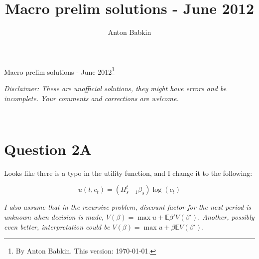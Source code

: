 \documentclass{article}
\title{Macro prelim solutions - June 2012}
\author{Anton Babkin}
\newcommand{\E}{\mathbb{E}}
\begin{document}
{\Large Macro prelim solutions - June 2012\footnote{By Anton
    Babkin. This version: \today.}}

\textit{Disclaimer: These are unofficial solutions, they might have
  errors and be incomplete. Your comments and corrections are welcome.}

\
\section*{Question 2A}

Looks like there is a typo in the utility function, and I change it to
the following:

\begin{equation*}
  u(t,c_t)=\left(\Pi_{s=1}^t\beta_s\right)\log(c_t)
\end{equation*}

\textit{I also assume that in the recursive problem, discount factor
  for the next period is unknown when decision is made,
  $V(\beta)=\max u+\E\beta'V(\beta')$. Another, possibly even better,
  interpretation could be $V(\beta)=\max u+\beta\E V(\beta')$.}
\end{document}

